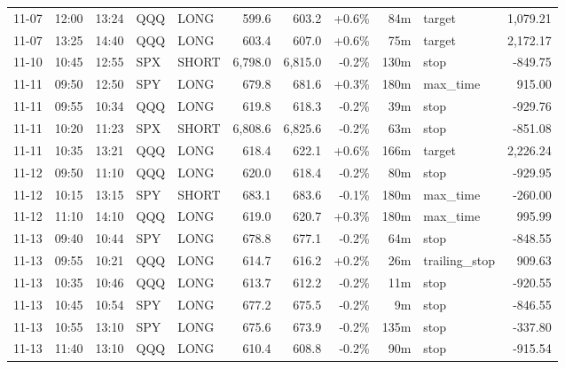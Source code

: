 \documentclass[11pt,a4paper,twoside]{article}
\begin{document}
\begin{center}
\begin{longtable}{>{\color{txtmain}}l l l l l r r r r >{\color{txtmain}}l r}
11-07 & 12:00 & 13:24 & QQQ & LONG & 599.6 & 603.2 & \textcolor{wingreen}{+0.6\%} & 84m & target & \textcolor{wingreen}{1,079.21} \\
11-07 & 13:25 & 14:40 & QQQ & LONG & 603.4 & 607.0 & \textcolor{wingreen}{+0.6\%} & 75m & target & \textcolor{wingreen}{2,172.17} \\
11-10 & 10:45 & 12:55 & SPX & SHORT & 6,798.0 & 6,815.0 & \textcolor{lossred}{-0.2\%} & 130m & stop & \textcolor{lossred}{-849.75} \\
11-11 & 09:50 & 12:50 & SPY & LONG & 679.8 & 681.6 & \textcolor{wingreen}{+0.3\%} & 180m & max\_time & \textcolor{wingreen}{915.00} \\
11-11 & 09:55 & 10:34 & QQQ & LONG & 619.8 & 618.3 & \textcolor{lossred}{-0.2\%} & 39m & stop & \textcolor{lossred}{-929.76} \\
11-11 & 10:20 & 11:23 & SPX & SHORT & 6,808.6 & 6,825.6 & \textcolor{lossred}{-0.2\%} & 63m & stop & \textcolor{lossred}{-851.08} \\
11-11 & 10:35 & 13:21 & QQQ & LONG & 618.4 & 622.1 & \textcolor{wingreen}{+0.6\%} & 166m & target & \textcolor{wingreen}{2,226.24} \\
11-12 & 09:50 & 11:10 & QQQ & LONG & 620.0 & 618.4 & \textcolor{lossred}{-0.2\%} & 80m & stop & \textcolor{lossred}{-929.95} \\
11-12 & 10:15 & 13:15 & SPY & SHORT & 683.1 & 683.6 & \textcolor{lossred}{-0.1\%} & 180m & max\_time & \textcolor{lossred}{-260.00} \\
11-12 & 11:10 & 14:10 & QQQ & LONG & 619.0 & 620.7 & \textcolor{wingreen}{+0.3\%} & 180m & max\_time & \textcolor{wingreen}{995.99} \\
11-13 & 09:40 & 10:44 & SPY & LONG & 678.8 & 677.1 & \textcolor{lossred}{-0.2\%} & 64m & stop & \textcolor{lossred}{-848.55} \\
11-13 & 09:55 & 10:21 & QQQ & LONG & 614.7 & 616.2 & \textcolor{wingreen}{+0.2\%} & 26m & trailing\_stop & \textcolor{wingreen}{909.63} \\
11-13 & 10:35 & 10:46 & QQQ & LONG & 613.7 & 612.2 & \textcolor{lossred}{-0.2\%} & 11m & stop & \textcolor{lossred}{-920.55} \\
11-13 & 10:45 & 10:54 & SPY & LONG & 677.2 & 675.5 & \textcolor{lossred}{-0.2\%} & 9m & stop & \textcolor{lossred}{-846.55} \\
11-13 & 10:55 & 13:10 & SPY & LONG & 675.6 & 673.9 & \textcolor{lossred}{-0.2\%} & 135m & stop & \textcolor{lossred}{-337.80} \\
11-13 & 11:40 & 13:10 & QQQ & LONG & 610.4 & 608.8 & \textcolor{lossred}{-0.2\%} & 90m & stop & \textcolor{lossred}{-915.54} \\

\end{longtable}
\end{center}
\end{document}
